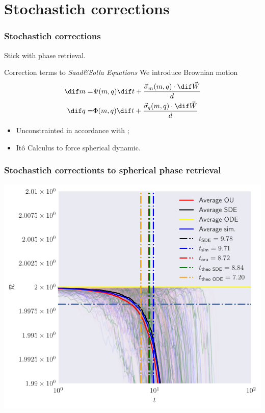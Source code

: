 \documentclass{beamer}
\begin{document}
\section{Stochastich corrections}
\begin{frame}
  \frametitle{Stochastich corrections}
  Stick with phase retrieval.
  \begin{exampleblock}{Correction terms to \emph{Saad\&Solla Equations}}
    We introduce Brownian motion
    \[\begin{split}
      \dif m =& \Psi{(m,q)}\dif t + \frac{\vec{\sigma}_m{(m,q)}\cdot\dif \vec{W}}{d} \\
      \dif q =& \Phi{(m,q)}\dif t + \frac{\vec{\sigma}_q{(m,q)}\cdot\dif \vec{W}}{d} 
    \end{split}\]
  \end{exampleblock}
  \pause 

  \begin{itemize}
    \item Unconstrainted in accordance with \cite{arous2022high};
    \item Itô Calculus to force spherical dynamic.
  \end{itemize}
\end{frame}

\begin{frame}
  \frametitle{Stochastich correctionts to spherical phase retrieval}
  \begin{center}
    \includegraphics[width=.85\textwidth]{figures/sde/spr_final_zoom.pdf}
  \end{center}
\end{frame}
\end{document}
